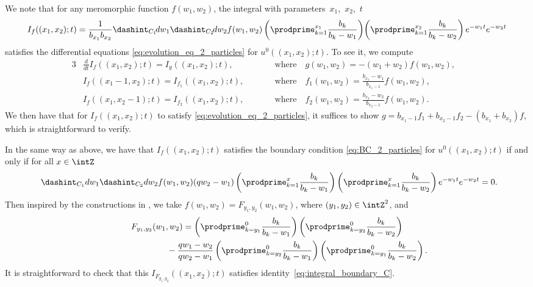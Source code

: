 We note that for any meromorphic function $f(w_1, w_2)$, the integral with parameters~$x_1$,~$x_2$,~$t$
\begin{gather*}
 I_f((x_1, x_2); t) = \frac{1}{b_{x_1} b_{x_2}} \dashint_{C_1} \! dw_1 \dashint_{C_2} \! dw_2 f(w_1, w_2) \left( \prodprime^{x_1}_{k = 1} \frac{b_k}{b_k - w_1} \right) \! \left( \prodprime^{x_2}_{k = 1} \frac{b_k}{b_k - w_2} \right) e^{-w_1 t} e^{-w_2 t}
\end{gather*}
satisf\/ies the dif\/ferential equations \eqref{eq:evolution_eq_2_particles} for $u^0((x_1, x_2); t)$. To see it, we compute
\begin{alignat*}{3}
 & \frac{d}{dt} I_f((x_1, x_2); t) =   I_g((x_1, x_2); t), \qquad && \text{where} \quad  g(w_1, w_2) =   -(w_1 + w_2) f(w_1, w_2),& \\
& I_f((x_1 - 1, x_2); t) =   I_{f_1}((x_1, x_2); t), \qquad && \text{where} \quad f_1(w_1, w_2) =   \frac{b_{x_1} - w_1}{b_{x_1 - 1}} f(w_1, w_2),& \\
& I_f((x_1, x_2 - 1); t) =   I_{f_2}((x_1, x_2); t), \qquad && \text{where} \quad  f_2(w_1, w_2) =   \frac{b_{x_2} - w_2}{b_{x_2 - 1}} f(w_1, w_2).&
\end{alignat*}
We then have that for $I_f((x_1, x_2); t)$ to satisfy \eqref{eq:evolution_eq_2_particles}, it suf\/f\/ices to show $g = b_{x_1 - 1} f_1 + b_{x_2 - 1} f_2 - (b_{x_1} + b_{x_2}) f$, which is straightforward to verify.

In the same way as above, we have that $I_f((x_1, x_2); t)$ satisf\/ies the boundary condition \eqref{eq:BC_2_particles} for $u^0((x_1, x_2); t)$ if and only if for all $x \in \intZ$
\begin{gather} \label{eq:integral_boundary_C}
 \dashint_{C_1} dw_1 \dashint_{C_2} dw_2 f(w_1, w_2) (qw_2 - w_1) \left( \prodprime^x_{k = 1} \frac{b_k}{b_k - w_1} \right) \left( \prodprime^x_{k = 1} \frac{b_k}{b_k - w_2} \right) e^{-w_1 t} e^{-w_2 t} = 0.\!\!\!
\end{gather}
Then inspired by the constructions in \cite{Korhonen-Lee14}, we take $f(w_1, w_2) = F_{y_1, y_2}(w_1, w_2)$, where $(y_1, y_2) \in \intZ^2$, and
\begin{gather*}
 F_{y_1, y_2}(w_1, w_2) = \left( \prodprime^0_{k = y_1} \frac{b_k}{b_k - w_1} \right) \left( \prodprime^0_{k = y_2} \frac{b_k}{b_k - w_2} \right) \\
 \hphantom{F_{y_1, y_2}(w_1, w_2) =}{}
 - \frac{qw_1 - w_2}{qw_2 - w_1} \left( \prodprime^0_{k = y_2} \frac{b_k}{b_k - w_1} \right) \left( \prodprime^0_{k = y_1} \frac{b_k}{b_k - w_2} \right).
\end{gather*}
It is straightforward to check that this $I_{F_{y_1, y_2}}((x_1, x_2); t)$ satisf\/ies identity~\eqref{eq:integral_boundary_C}.

